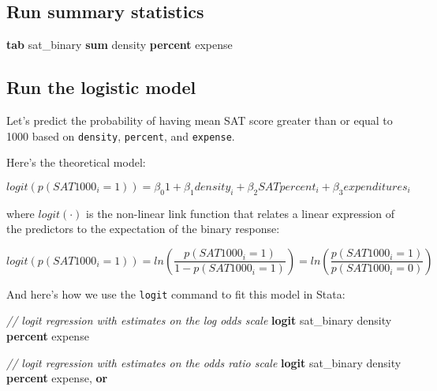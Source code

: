 \documentclass[
]{book}
\newenvironment{Shaded}{\begin{snugshade}}{\end{snugshade}}
\newcommand{\CommentTok}[1]{\textcolor[rgb]{0.56,0.35,0.01}{\textit{#1}}}
\newcommand{\KeywordTok}[1]{\textcolor[rgb]{0.13,0.29,0.53}{\textbf{#1}}}
\newcommand{\NormalTok}[1]{#1}
\begin{document}
\hypertarget{run-summary-statistics}{%
\subsection{Run summary statistics}\label{run-summary-statistics}}

\begin{Shaded}
\begin{Highlighting}[]
\KeywordTok{tab}\NormalTok{ sat\_binary}
\KeywordTok{sum}\NormalTok{ density }\KeywordTok{percent}\NormalTok{ expense }
\end{Highlighting}
\end{Shaded}

\hypertarget{run-the-logistic-model}{%
\subsection{Run the logistic model}\label{run-the-logistic-model}}

Let's predict the probability of having mean SAT score greater than or equal to 1000 based on \texttt{density}, \texttt{percent}, and \texttt{expense}.

Here's the theoretical model:

\begin{alert}

\[
logit(p(SAT1000_i = 1)) = \beta_{0}1 + \beta_1density_i + \beta_2SATpercent_i + \beta_3expenditures_i 
\]

\end{alert}

where \(logit(\cdot)\) is the non-linear link function that relates a linear expression of the predictors to the expectation of the binary response:

\begin{alert}

\[
logit(p(SAT1000_i = 1)) = ln \left( \frac{p(SAT1000_i = 1)}{1-p(SAT1000_i = 1)} \right) = ln \left( \frac{p(SAT1000_i = 1)}{p(SAT1000_i = 0)} \right)
\]

\end{alert}

And here's how we use the \texttt{logit} command to fit this model in Stata:

\begin{Shaded}
\begin{Highlighting}[]
\CommentTok{// logit regression with estimates on the log odds scale }
\KeywordTok{logit}\NormalTok{ sat\_binary density }\KeywordTok{percent}\NormalTok{ expense}

\CommentTok{// logit regression with estimates on the odds ratio scale }
\KeywordTok{logit}\NormalTok{ sat\_binary density }\KeywordTok{percent}\NormalTok{ expense, }\KeywordTok{or} 
\end{Highlighting}
\end{Shaded}
\end{document}
